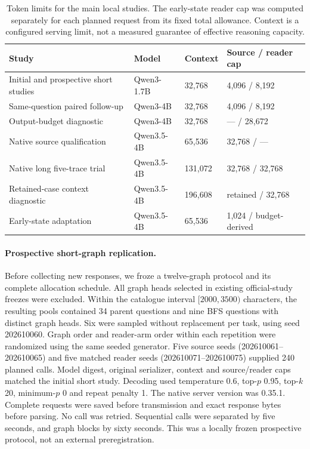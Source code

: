 \begin{table}[htbp]
\centering\small
\begin{tabular}{>{\raggedright\arraybackslash}p{.33\linewidth}lll}
\toprule
Study & Model & Context & Source / reader cap\\
\midrule
Initial and prospective short studies & Qwen3-1.7B & 32,768 & 4,096 / 8,192\\
Same-question paired follow-up & Qwen3-4B & 32,768 & 4,096 / 8,192\\
Output-budget diagnostic & Qwen3-4B & 32,768 & --- / 28,672\\
Native source qualification & Qwen3.5-4B & 65,536 & 32,768 / ---\\
Native long five-trace trial & Qwen3.5-4B & 131,072 & 32,768 / 32,768\\
Retained-case context diagnostic & Qwen3.5-4B & 196,608 & retained / 32,768\\
Early-state adaptation & Qwen3.5-4B & 65,536 & 1,024 / budget-derived\\
\bottomrule
\end{tabular}
\caption{Token limits for the main local studies. The early-state reader cap was computed separately for each planned request from its fixed total allowance. Context is a configured serving limit, not a measured guarantee of effective reasoning capacity.}
\label{tab:local-configurations}
\end{table}

\paragraph{Prospective short-graph replication.} Before collecting new responses, we froze a twelve-graph protocol and its complete allocation schedule. All graph heads selected in existing official-study freezes were excluded. Within the catalogue interval $[2000,3500)$ characters, the resulting pools contained 34 parent questions and nine BFS questions with distinct graph heads. Six were sampled without replacement per task, using seed 202610060. Graph order and reader-arm order within each repetition were randomized using the same seeded generator. Five source seeds (202610061--202610065) and five matched reader seeds (202610071--202610075) supplied 240 planned calls. Model digest, original serializer, context and source/reader caps matched the initial short study. Decoding used temperature 0.6, top-$p$ 0.95, top-$k$ 20, minimum-$p$ 0 and repeat penalty 1. The native server version was 0.35.1. Complete requests were saved before transmission and exact response bytes before parsing. No call was retried. Sequential calls were separated by five seconds, and graph blocks by sixty seconds. This was a locally frozen prospective protocol, not an external preregistration.

